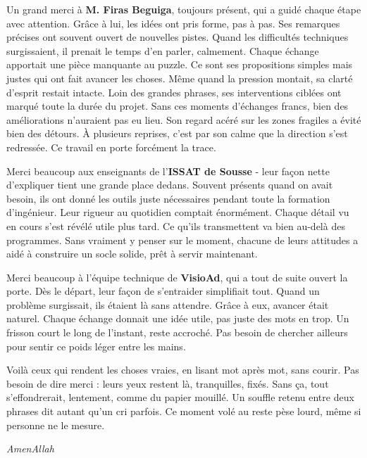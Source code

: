 \vspace{0.3cm}

Un grand merci à \textbf{M. Firas Beguiga}, toujours présent, qui a guidé chaque étape avec attention. Grâce à lui, les idées ont pris forme, pas à pas. Ses remarques précises ont souvent ouvert de nouvelles pistes. Quand les difficultés techniques surgissaient, il prenait le temps d’en parler, calmement. Chaque échange apportait une pièce manquante au puzzle. Ce sont ses propositions simples mais justes qui ont fait avancer les choses. Même quand la pression montait, sa clarté d’esprit restait intacte. Loin des grandes phrases, ses interventions ciblées ont marqué toute la durée du projet. Sans ces moments d’échanges francs, bien des améliorations n’auraient pas eu lieu. Son regard acéré sur les zones fragiles a évité bien des détours. À plusieurs reprises, c’est par son calme que la direction s’est redressée. Ce travail en porte forcément la trace.

\vspace{0.3cm}

Merci beaucoup aux enseignants de l’\textbf{ISSAT de Sousse} - leur façon nette d’expliquer tient une grande place dedans. Souvent présents quand on avait besoin, ils ont donné les outils juste nécessaires pendant toute la formation d'ingénieur. Leur rigueur au quotidien comptait énormément. Chaque détail vu en cours s’est révélé utile plus tard. Ce qu’ils transmettent va bien au-delà des programmes. Sans vraiment y penser sur le moment, chacune de leurs attitudes a aidé à construire un socle solide, prêt à servir maintenant.

\vspace{0.3cm}
Merci beaucoup à l’équipe technique de \textbf{VisioAd}, qui a tout de suite ouvert la porte. Dès le départ, leur façon de s’entraider simplifiait tout. Quand un problème surgissait, ils étaient là sans attendre. Grâce à eux, avancer était naturel. Chaque échange donnait une idée utile, pas juste des mots en trop. Un frisson court le long de l'instant, reste accroché. Pas besoin de chercher ailleurs pour sentir ce poids léger entre les mains.

\vspace{0.3cm}

Voilà ceux qui rendent les choses vraies, en lisant mot après mot, sans courir. Pas besoin de dire merci : leurs yeux restent là, tranquilles, fixés. Sans ça, tout s’effondrerait, lentement, comme du papier mouillé. Un souffle retenu entre deux phrases dit autant qu’un cri parfois. Ce moment volé au reste pèse lourd, même si personne ne le mesure.

\vspace{0.5cm}

\hfill{\itshape AmenAllah}

\linespread{1.0}